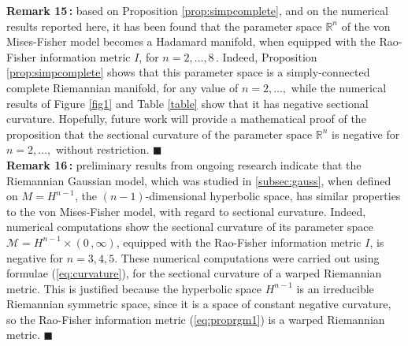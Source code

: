 \documentclass{svmult}
\begin{document}
\noindent \textbf{Remark 15\,:} based on Proposition \ref{prop:simpcomplete}, and on the numerical results reported here, it has been found that the parameter space $\mathbb{R}^n$ of the von Mises-Fisher model becomes a Hadamard manifold, when equipped with the Rao-Fisher information metric $I$, for $n = 2,\ldots,8$\,. Indeed, Proposition \ref{prop:simpcomplete} shows that this parameter space is a simply-connected complete Riemannian manifold, for any value of $n = 2,\ldots,$ while the numerical results of Figure \ref{fig1} and Table \ref{table} show that it has negative sectional curvature. Hopefully, future work will provide a mathematical proof  of the proposition that the sectional curvature of the parameter space $\mathbb{R}^n$ is negative for  $n = 2,\ldots,$ without restriction. \hfill$\blacksquare$ \\[0.1cm]
\textbf{Remark 16\,:} preliminary results from ongoing research indicate that the Riemannian Gaussian model, which was studied in \ref{subsec:gauss}, when defined on $M = H^{n-1}$, the $(n-1)$-dimensional hyperbolic space, has similar properties to the von Mises-Fisher model, with regard to sectional curvature. Indeed, numerical computations show the sectional curvature of its parameter space $\mathcal{M} = H^{n-1} \times (0\,,\infty)$, equipped with the Rao-Fisher information metric $I$, is negative for $n = 3, 4, 5$. These numerical computations were carried out using formulae (\ref{eq:curvature}), for the sectional curvature of a warped Riemannian metric. This is justified because the hyperbolic space $H^{n-1}$ is an irreducible Riemannian symmetric space, since it is a space of constant negative curvature, so the Rao-Fisher information metric (\ref{eq:proprgm1}) is a warped Riemannian metric. \hfill$\blacksquare$ 
\end{document}
